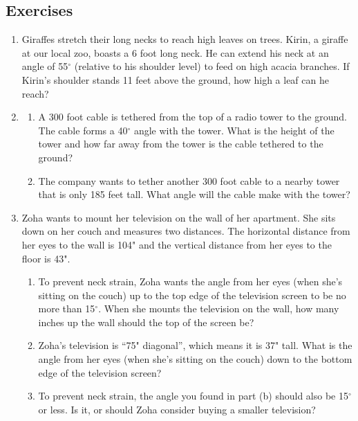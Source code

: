 \subsection*{Exercises}

\begin{enumerate} 

\item %
Giraffes stretch their long necks to reach high leaves on trees.  Kirin, a giraffe at our local zoo, boasts a 6 foot long neck.  He can extend his neck at an angle of 55$^\circ$ (relative to his shoulder level) to feed on high acacia branches. If Kirin's shoulder stands 11 feet above the ground, how high a leaf can he reach?

\item %
\begin{enumerate}
    \item A 300 foot cable is tethered from the top of a radio tower to the ground.  The cable forms a 40$^\circ$ angle with the tower. What is the height of the tower and how far away from the tower is the cable tethered to the ground?
    \item The company wants to tether another 300 foot cable to a nearby tower that is only 185 feet tall.  What angle will the cable make with the tower?
\end{enumerate}

\item %
Zoha wants to mount her television on the wall of her apartment. She sits down on her couch and measures two distances.  The horizontal distance from her eyes to the wall is 104" and the vertical distance from her eyes to the floor is 43".

\begin{enumerate}
    \item To prevent neck strain, Zoha wants the angle from her eyes (when she's sitting on the couch) up to the top edge of the television screen to be no more than 15$^\circ$. When she mounts the television on the wall, how many inches up the wall should the top of the screen be?
    \item Zoha's television is ``75" diagonal'', which means it is 37" tall. What is the angle from her eyes (when she's sitting on the couch) down to the bottom edge of the television screen?  
    \item To prevent neck strain, the angle you found in part (b) should also be 15$^\circ$ or less.  Is it, or should Zoha consider buying a smaller television?
\end{enumerate}


\end{enumerate}

